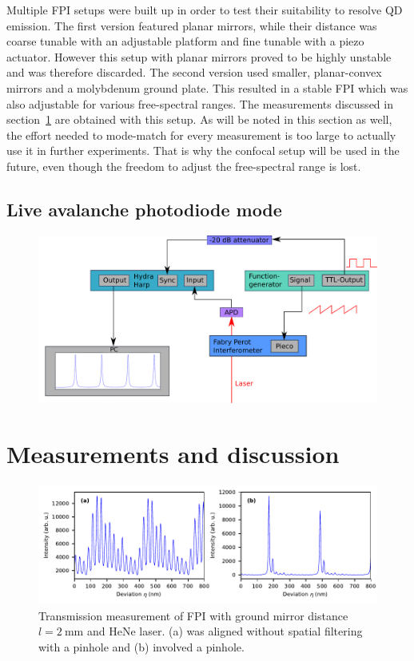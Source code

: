 Multiple \ac{FPI} setups were built up in order to test their suitability to resolve \ac{QD} emission.
The first version featured planar mirrors, while their distance was coarse tunable with an adjustable platform and fine tunable with a piezo actuator.
However this setup with planar mirrors proved to be highly unstable and was therefore discarded.
The second version used smaller, planar-convex mirrors and a molybdenum ground plate.
This resulted in a stable \ac{FPI} which was also adjustable for various free-spectral ranges.
The measurements discussed in section~\ref{sec:fabry-measurements} are obtained with this setup.
As will be noted in this section as well, the effort needed to mode-match for every measurement is too large to actually use it in further experiments.
That is why the confocal setup will be used in the future, even though the freedom to adjust the free-spectral range is lost.

\subsection{Live avalanche photodiode mode}


\begin{figure}[H]
	\centering
	\includegraphics[width=\linewidth]{figures/fabry-perot/live-apd-setup}
	\caption{}
	\label{fig:live-apd-setup}
\end{figure}


\section{Measurements and discussion}
\label{sec:fabry-measurements}

\begin{figure}[H]
	\centering
	\includegraphics[width=\linewidth]{figures/fabry-perot/plots/measurement-fabry-perot-HeNe}
	\caption{Transmission measurement of FPI with ground mirror distance $l = \SI{2}{\milli \meter}$ and HeNe laser. (a) was aligned without spatial filtering with a pinhole and (b) involved a pinhole.}
	\label{fig:measurement-fabry-perot-hene}
\end{figure}


